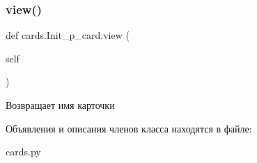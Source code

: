 \subsubsection{\texorpdfstring{view()}{view()}}
{\footnotesize\ttfamily def cards.\+Init\+\_\+p\+\_\+card.\+view (\begin{DoxyParamCaption}\item[{}]{self }\end{DoxyParamCaption})}



Возвращает имя карточки 



Объявления и описания членов класса находятся в файле\+:\begin{DoxyCompactItemize}
\item 
cards.\+py\end{DoxyCompactItemize}
